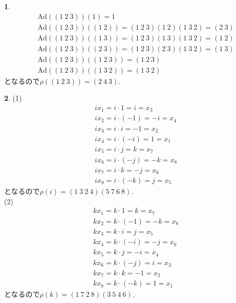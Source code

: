 \documentclass{amsart}
\theoremstyle{definition}
\newtheorem{ans}{}
\numberwithin{ans}{subsection}
\newcommand{\Ad}[1]{\mathrm{Ad}(#1)}
\begin{document}
\begin{ans}
  \begin{align*}
    &\Ad{(1\ 2\ 3)}(1) = 1\\
    &\Ad{(1\ 2\ 3)}((1\ 2)) = (1\ 2\ 3)(1\ 2)(1\ 3\ 2) = (2\ 3)\\
    &\Ad{(1\ 2\ 3)}((1\ 3)) = (1\ 2\ 3)(1\ 3)(1\ 3\ 2) = (1\ 2)\\
    &\Ad{(1\ 2\ 3)}((2\ 3)) = (1\ 2\ 3)(2\ 3)(1\ 3\ 2) = (1\ 3)\\
    &\Ad{(1\ 2\ 3)}((1\ 2\ 3)) = (1\ 2\ 3)\\
    &\Ad{(1\ 2\ 3)}((1\ 3\ 2)) = (1\ 3\ 2)
  \end{align*}
  となるので$\rho((1\ 2\ 3)) = (2\ 4\ 3)$.
\end{ans}

\begin{ans}
  (1)
  \begin{align*}
    &ix_1 = i \cdot 1 = i = x_3\\
    &ix_2 = i \cdot (-1) = -i = x_4\\
    &ix_3 = i \cdot i = -1 = x_2\\
    &ix_4 = i \cdot (-i) = 1 = x_1\\
    &ix_5 = i \cdot j = k = x_7\\
    &ix_6 = i \cdot (-j) = -k = x_8\\
    &ix_7 = i \cdot k = -j = x_6\\
    &ix_8 = i \cdot (-k) = j = x_5
  \end{align*}
  となるので$\rho(i) = (1\ 3\ 2\ 4)(5\ 7\ 6\ 8)$.\\
  (2)
  \begin{align*}
    &kx_1 = k \cdot 1 = k = x_7\\
    &kx_2 = k \cdot (-1) = -k = x_8\\
    &kx_3 = k \cdot i = j = x_5\\
    &kx_4 = k \cdot (-i) = -j = x_6\\
    &kx_5 = k \cdot j = -i = x_4\\
    &kx_6 = k \cdot (-j) = i = x_3\\
    &kx_7 = k \cdot k = -1 = x_2\\
    &kx_8 = k \cdot (-k) = 1 = x_1
  \end{align*}
  となるので$\rho(k) = (1\ 7\ 2\ 8)(3\ 5\ 4\ 6)$.
\end{ans}
\end{document}

